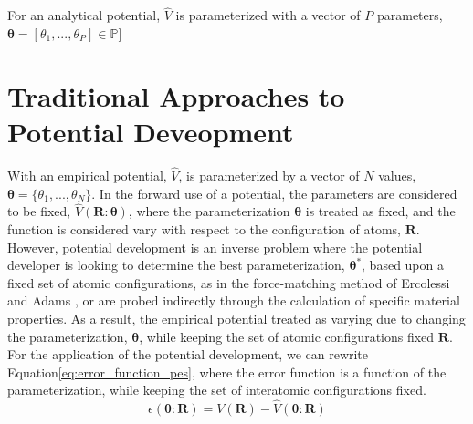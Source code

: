 For an analytical potential, $\hat{V}$ is parameterized with a vector of $P$ parameters, $\bm{\theta} = [\theta_1,...,\theta_P] \in \mathbb{P}]$
\section{Traditional Approaches to Potential Deveopment}

With an empirical potential, $\hat{V}$, is parameterized by a vector of $N$ values,
${\bm{\theta}=\{\theta_1,...,\theta_N\}}$.
In the forward use of a potential, the parameters are considered to be fixed, $\hat{V}(\bm{R}:\bm{\theta})$, where the parameterization $\bm{\theta}$ is treated as fixed, and the function is considered vary with respect to the configuration of atoms, $\bm{R}$.
However, potential development is an inverse problem where the potential developer is looking to determine the best parameterization, $\bm{\theta}^*$, based upon a fixed set of atomic configurations, as in the force-matching method of Ercolessi and Adams \cite{ercolessi1994_fitting_forcematching}
, or are probed indirectly through the calculation of specific material properties.
As a result, the empirical potential treated as varying due to changing the parameterization, $\bm{\theta}$, while keeping the set of atomic configurations fixed $\bm{R}$.  For the application of the potential development, we can rewrite Equation\ref{eq:error_function_pes}, where the error function is a function of the parameterization, while keeping the set of interatomic configurations fixed.
\begin{equation}
	\epsilon(\bm{\theta}:\bm{R})=V(\bm{R})-\hat{V}(\bm{\theta}:\bm{R})
\end{equation}
\\

